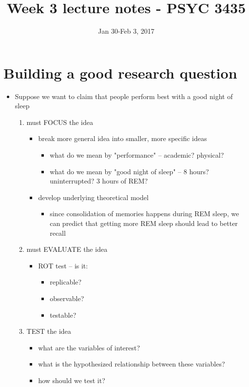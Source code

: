 \documentclass[11pt]{article}
\date{Jan 30-Feb 3, 2017}
\title{Week 3 lecture notes - PSYC 3435}
\begin{document}
\maketitle

\section*{Building a good research question}
\label{sec-1}
\begin{itemize}
\item Suppose we want to claim that people perform best with a good night of sleep
\begin{enumerate}
\item must FOCUS the idea
\begin{itemize}
\item break more general idea into smaller, more specific ideas
\begin{itemize}
\item what do we mean by "performance" -- academic? physical?
\item what do we mean by "good night of sleep" -- 8 hours? uninterrupted? 3 hours of REM?
\end{itemize}
\item develop underlying theoretical model
\begin{itemize}
\item since consolidation of memories happens during REM sleep, we can predict that getting more REM sleep should lead to better recall
\end{itemize}
\end{itemize}
\item must EVALUATE the idea
\begin{itemize}
\item ROT test -- is it:
\begin{itemize}
\item replicable?
\item observable?
\item testable?
\end{itemize}
\end{itemize}
\item TEST the idea
\begin{itemize}
\item what are the variables of interest?
\item what is the hypothesized relationship between these variables?
\item how should we test it?
\end{itemize}
\end{enumerate}
\end{itemize}
\end{document}
